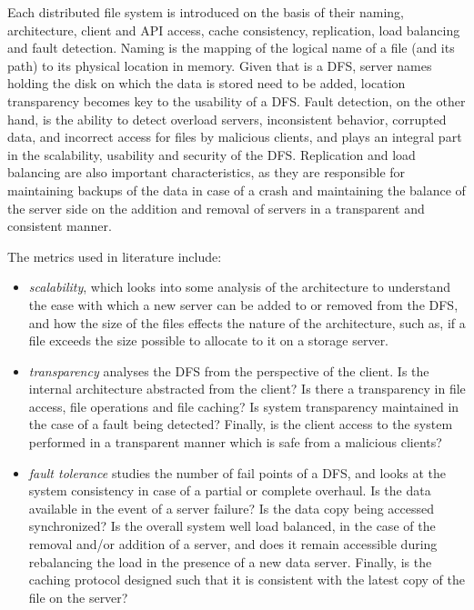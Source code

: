 \documentclass{article}
\begin{document}
Each distributed file system is introduced on the basis of their naming, architecture, client and API access, cache consistency, replication, load balancing and fault detection. Naming is the mapping of the logical name of a file (and its path) to its physical location in memory. Given that is a DFS, server names holding the disk on which the data is stored need to be added, location transparency becomes key to the usability of a DFS. Fault detection, on the other hand, is the ability to detect overload servers, inconsistent behavior, corrupted data, and incorrect access for files by malicious clients, and plays an integral part in the scalability, usability and security of the DFS. Replication and load balancing are also important characteristics, as they are responsible for maintaining backups of the data in case of a crash and maintaining the balance of the server side on the addition and removal of servers in a transparent and consistent manner.

The metrics used in literature include:
\begin{itemize}
    \item \textit{scalability}, which looks into some analysis of the architecture to understand the ease with which a new server can be added to or removed from the DFS, and how the size of the files effects the nature of the architecture, such as, if a file exceeds the size possible to allocate to it on a storage server.
    
    \item \textit{transparency} analyses the DFS from the perspective of the client. Is the internal architecture abstracted from the client? Is there a transparency in file access, file operations and file caching? Is system transparency maintained in the case of a fault being detected? Finally, is the client access to the system performed in a transparent manner which is safe from a malicious clients?
    
    \item \textit{fault tolerance} studies the number of fail points of a DFS, and looks at the system consistency in case of a partial or complete overhaul. Is the data available in the event of a server failure? Is the data copy being accessed synchronized? Is the overall system well load balanced, in the case of the removal and/or addition of a server, and does it remain accessible during rebalancing the load in the presence of a new data server. Finally, is the caching protocol designed such that it is consistent with the latest copy of the file on the server?
\end{itemize}
\end{document}
